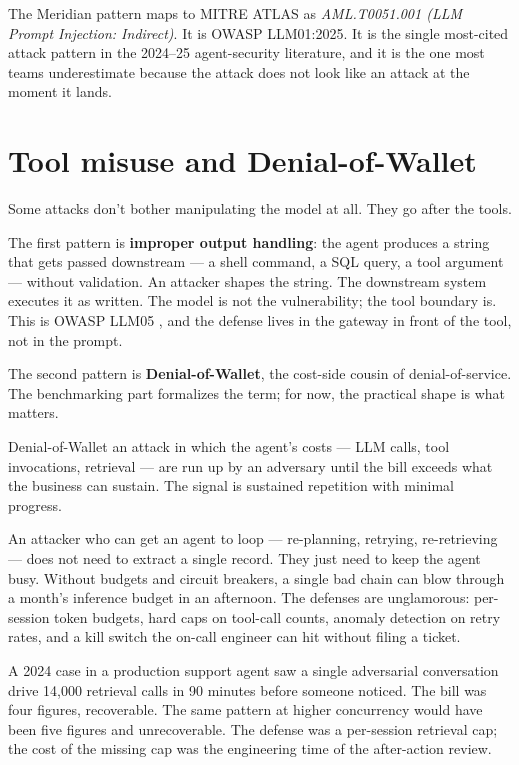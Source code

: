 The Meridian pattern maps to MITRE ATLAS as \textit{AML.T0051.001 (LLM Prompt Injection: Indirect)}. It is OWASP LLM01:2025. It is the single most-cited attack pattern in the 2024--25 agent-security literature, and it is the one most teams underestimate because the attack does not look like an attack at the moment it lands.

\section{Tool misuse and Denial-of-Wallet}

Some attacks don't bother manipulating the model at all. They go after the tools.

The first pattern is \textbf{improper output handling}: the agent produces a string that gets passed downstream --- a shell command, a SQL query, a tool argument --- without validation. An attacker shapes the string. The downstream system executes it as written. The model is not the vulnerability; the tool boundary is. This is OWASP LLM05 \citep{owaspLLM05-2025}, and the defense lives in the gateway in front of the tool, not in the prompt.

The second pattern is \textbf{Denial-of-Wallet}, the cost-side cousin of denial-of-service. The benchmarking part formalizes the term; for now, the practical shape is what matters.

\begin{TNdefinition}{Denial-of-Wallet}
an attack in which the agent's costs --- LLM calls, tool invocations, retrieval --- are run up by an adversary until the bill exceeds what the business can sustain. The signal is sustained repetition with minimal progress.
\end{TNdefinition}

An attacker who can get an agent to loop --- re-planning, retrying, re-retrieving --- does not need to extract a single record. They just need to keep the agent busy. Without budgets and circuit breakers, a single bad chain can blow through a month's inference budget in an afternoon. The defenses are unglamorous: per-session token budgets, hard caps on tool-call counts, anomaly detection on retry rates, and a kill switch the on-call engineer can hit without filing a ticket.

\begin{TNwarning}
A 2024 case in a production support agent saw a single adversarial conversation drive 14,000 retrieval calls in 90 minutes before someone noticed. The bill was four figures, recoverable. The same pattern at higher concurrency would have been five figures and unrecoverable. The defense was a per-session retrieval cap; the cost of the missing cap was the engineering time of the after-action review.
\end{TNwarning}

